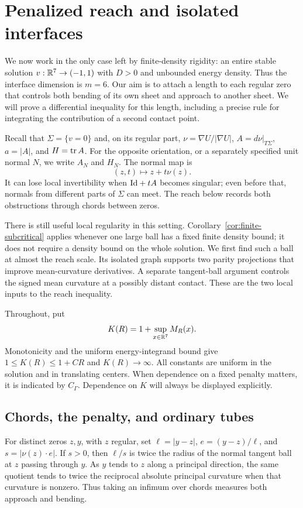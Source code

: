 \section{Penalized reach and isolated interfaces}\label{sec:reach}

We now work in the only case left by finite-density rigidity: an
entire stable solution $v:\mathbb R^7\to(-1,1)$ with $D>0$ and unbounded
energy density.  Thus the interface dimension is $m=6$.
Our aim is to attach a length to each regular zero that controls both
bending of its own sheet and approach to another sheet.  We will prove
a differential inequality for this length, including a precise rule
for integrating the contribution of a second contact point.

Recall that $\Sigma=\{v=0\}$ and, on its regular part,
$\nu=\nabla U/|\nabla U|$, $A=d\nu|_{T\Sigma}$, $a=|A|$, and
$H=\operatorname{tr} A$.  For the opposite orientation, or a separately specified
unit normal $N$, we write $A_N$ and $H_N$.
The normal map is
\[
 (z,t)\longmapsto z+t\nu(z).
\]
It can lose local invertibility when $\mathrm{Id}+tA$ becomes singular;
even before that, normals from different parts of $\Sigma$ can meet.
The reach below records both obstructions through chords between zeros.

There is still useful local regularity in this setting.
Corollary~\ref{cor:finite-subcritical} applies whenever one large ball
has a fixed finite density bound; it does not require a density bound
on the whole solution.  We first find such a ball at almost the reach
scale.  Its isolated graph supports two parity projections that improve
mean-curvature derivatives.  A separate tangent-ball argument controls
the signed mean curvature at a possibly distant contact.  These are
the two local inputs to the reach inequality.

Throughout, put
\[
 K(R)=1+\sup_{x\in\mathbb R^7}M_R(x).
\]
Monotonicity and the uniform energy-integrand bound give
$1\le K(R)\le1+CR$ and $K(R)\to\infty$.
All constants are uniform in the solution and in translating centers.
When dependence on a fixed penalty matters, it is indicated by
$C_\Gamma$.  Dependence on $K$ will always be displayed explicitly.

\subsection{Chords, the penalty, and ordinary tubes}

For distinct zeros $z,y$, with $z$ regular, set
$\ell=|y-z|$, $e=(y-z)/\ell$, and $s=|\nu(z)\cdot e|$.
If $s>0$, then $\ell/s$ is twice the radius of the normal tangent
ball at $z$ passing through $y$.  As $y$ tends to $z$ along a
principal direction, the same quotient tends to twice the reciprocal
absolute principal curvature when that curvature is nonzero.
Thus taking an infimum over chords
measures both approach and bending.


